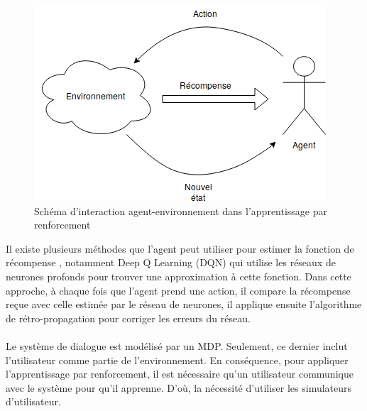 \begin{figure}[H]
	\centering
	\includegraphics[width=.5\linewidth]{images/DM/RLSchema.png} 
	\caption{Schéma d'interaction agent-environnement dans l'apprentissage par renforcement} 
\end{figure}
Il existe plusieurs méthodes que l’agent peut utiliser pour estimer la fonction de récompense \cite{Dimitri2012}, notamment Deep Q Learning (DQN) \cite{Mnih2015} qui utilise les réseaux de neurones profonds pour trouver une approximation à cette fonction. Dans cette approche, à chaque fois que l'agent prend une action, il compare la récompense reçue avec celle estimée par le réseau de neurones, il applique ensuite l'algorithme de rétro-propagation pour corriger les erreurs du réseau. 

\paragraph{}
Le système de dialogue est modélisé par un MDP. Seulement, ce dernier inclut l’utilisateur comme partie de l’environnement. En conséquence, pour appliquer l’apprentissage par renforcement, il est nécessaire qu’un utilisateur communique avec le système pour qu’il apprenne. D’où, la nécessité d’utiliser les simulateurs d’utilisateur.

